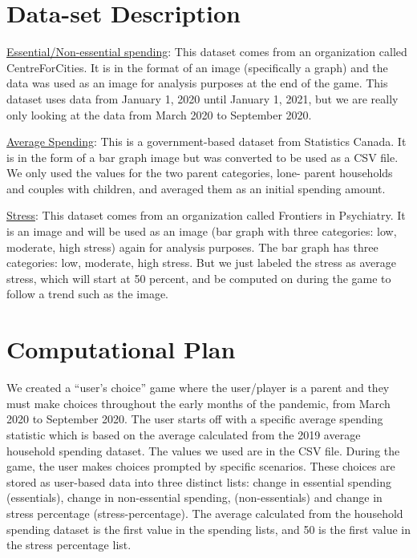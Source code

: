 \documentclass[fontsize=11pt]{article}
\begin{document}
    \section*{Data-set Description}

    \underline{Essential/Non-essential spending}: This dataset comes from an organization called CentreForCities. It is in the format of an image (specifically a graph) and the data was used as an image for analysis purposes at the end of the game. This dataset uses data from January 1, 2020 until January 1, 2021, but we are really only looking at the data from March 2020 to September 2020.

    \underline{Average Spending}: This is a government-based dataset from Statistics Canada. It is in the form of a bar graph image but was converted to be used as a CSV file. We only used the values for the two parent categories, lone- parent households and couples with children, and averaged them as an initial spending amount.

    \underline{Stress}: This dataset comes from an organization called Frontiers in Psychiatry. It is an image and will be used as an image (bar graph with three categories: low, moderate, high stress) again for analysis purposes. The bar graph has three categories: low, moderate, high stress. But we just labeled the stress as average stress, which will start at 50 percent, and be computed on during the game to follow a trend such as the image.


    \section*{Computational Plan}

    We created a “user’s choice” game where the user/player is a parent and they must make choices throughout the early months of the pandemic, from March 2020 to September 2020. The user starts off with a specific average spending statistic which is based on the average calculated from the 2019 average household spending dataset. The values we used are in the CSV file. During the game, the user makes choices prompted by specific scenarios. These choices are stored as user-based data into three distinct lists: change in essential spending (essentials), change in non-essential spending, (non-essentials) and change in stress percentage (stress-percentage). The average calculated from the household spending dataset is the first value in the spending lists, and 50 is the first value in the stress percentage list.
\end{document}
